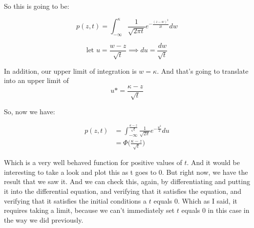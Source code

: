 \documentclass{article}
\begin{document}
So this is going to be: 

$$	p(z,t) =    \int_{-\infty}^{\kappa} \frac{1}{\sqrt{2 \pi t}} e^{-\frac{(z-w)^2}{2t}} dw  $$

$$ \text{let } u = \frac{w-z}{\sqrt{t}}  \implies du = \frac{dw}{\sqrt{t}}$$

In addition, our upper limit of integration is $w=\kappa$.
And that's going to translate into an upper limit of 
$$u* = \frac{\kappa-z}{\sqrt{t}} $$

So, now we have:

\begin{equation*} 
	\begin{split}
		p(z,t) &=   \int_{-\infty}^{\frac{\kappa-z}{\sqrt{t}}} \frac{1}{\sqrt{2 \pi }} e^{-\frac{u^2}{2}} du \\	
		&=   \Phi \Big(\frac{\kappa-z}{\sqrt{t}} \Big)
	\end{split}
\end{equation*}

Which is a very well behaved function
for positive values of $t$.
And it would be interesting to take a look
and plot this as t goes to 0.
But right now, we have the result that we saw it.
And we can check this, again, by differentiating and putting it
into the differential equation, and verifying that it satisfies
the equation, and verifying that it
satisfies the initial conditions a $t$ equals 0.
Which as I said, it requires taking a limit,
because we can't immediately set $t$ equals 0
in this case in the way we did previously.

	
\end{document}
